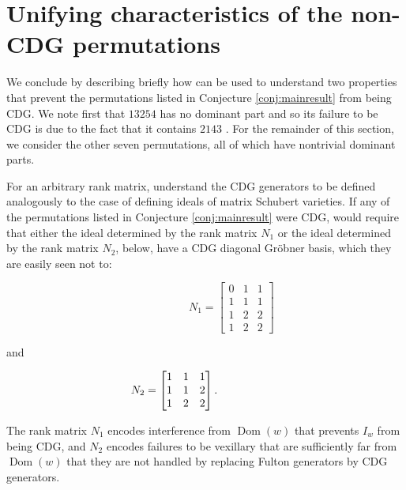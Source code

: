 \documentclass[ALCO,Unicode,published]{cedram}
\DeclareMathOperator{\Dom}{Dom}
\begin{document}
\section{Unifying characteristics of the non-CDG permutations}\label{sect:intuition}
We conclude by describing briefly how \cite[Theorem 2.1(a)]{KMY09} can be used to understand two properties that prevent the permutations listed in Conjecture \ref{conj:mainresult} from being CDG.  We note first that $13254$ has no dominant part and so its failure to be CDG is due to the fact that it contains $2143$ \cite[Theorem 6.1]{KMY09}.  For the remainder of this section, we consider the other seven permutations, all of which have nontrivial dominant parts.  

For an arbitrary rank matrix, understand the CDG generators to be defined analogously to the case of defining ideals of matrix Schubert varieties.  If any of the permutations listed in Conjecture \ref{conj:mainresult} were CDG, \cite[Theorem 2.1(a)]{KMY09} would require that either the ideal determined by the rank matrix $N_1$ or the ideal determined by the rank matrix $N_2$, below, have a CDG diagonal Gr\"obner basis, which they are easily seen not to:  \newline
\begin{minipage}{0.33\textwidth}\centering\[\hspace{2cm}
N_1 = \begin{bmatrix}
        0 & 1 & 1  \\
        1 & 1 & 1 \\
        1 & 2 &2  \\
        1 & 2 & 2  
        \end{bmatrix} 
\]\end{minipage}\begin{minipage}{.33\textwidth}
\centering and 
\end{minipage} \begin{minipage}{0.33\textwidth} \centering\[\hspace{-2cm}
N_2 = \begin{bmatrix}
        1 & 1 & 1  \\
        1 & 1 & 2  \\
        1 & 2 &2  \\
        \end{bmatrix}.
\] 
\end{minipage}

The rank matrix $N_1$ encodes interference from $\Dom(w)$ that prevents $I_w$ from being CDG, and $N_2$ encodes failures to be vexillary that are sufficiently far from $\Dom(w)$ that they are not handled by replacing Fulton generators by CDG generators. 
\end{document}

